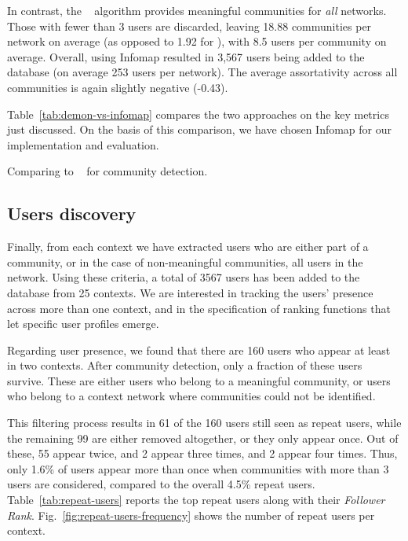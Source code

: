 In contrast, the \infomap~ algorithm provides meaningful communities for \textit{all} networks.
Those with fewer than 3 users are discarded, leaving  18.88 communities per network on average (as opposed to 1.92 for \demon), with 8.5 users per community on average.
Overall, using Infomap resulted in 3,567 users being added to the database (on average 253 users per network).
The average assortativity across all communities is again slightly negative (-0.43).

Table~\ref{tab:demon-vs-infomap} compares the two approaches on the key metrics just discussed. On the basis of this comparison, we have chosen Infomap for  our implementation and evaluation.

\begin{table}
	\resizebox{\textwidth}{!}{
	    
	}
	\caption{Comparing \demon to \infomap~ for community detection.}
	\label{tab:demon-vs-infomap}
\end{table}

\subsection{Users discovery}  \label{sec:users}

Finally, from each context we have extracted users who are either part of a community, or in the case of non-meaningful communities, all users in the network.
Using these criteria, a total of 3567 users has been added to the database from 25 contexts.
We are interested in tracking the users' presence across more than one context, and in the specification of ranking functions that let specific user profiles emerge.

Regarding user presence, we found that there are 160 users who appear at least in two contexts. 
After community detection, only a fraction of these users survive. 
These are either users who belong to a meaningful community, or users who belong to a context network where communities could not be identified.

This filtering process results in 61 of the 160 users still seen as repeat users, while the remaining 99 are either removed altogether, or they only appear once. 
Out of these, 55 appear twice, and 2 appear three times, and 2 appear four times. 
Thus, only 1.6\% of users appear more than once when communities with more than 3 users are considered, compared to the overall 4.5\% repeat users.
%
Table~\ref{tab:repeat-users} reports the top repeat users along with their \textit{Follower Rank}.  
%
Fig.~\ref{fig:repeat-users-frequency} shows the number of repeat users per context. 


